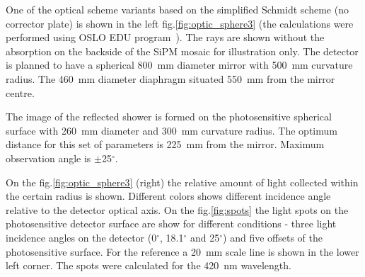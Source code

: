 \documentclass[a4paper,11pt]{article}
\begin{document}
One of the optical scheme variants based on the simplified Schmidt scheme (no corrector plate) is shown in the left fig.\ref{fig:optic_sphere3} (the calculations were performed using OSLO EDU program~\cite{Oslo}). The rays are shown without the absorption on the backside of the SiPM mosaic for illustration only. The detector is planned to have a spherical 800~mm diameter mirror with 500~mm curvature radius. The 460~mm diameter diaphragm situated 550~mm from the mirror centre.

The image of the reflected shower is formed on the photosensitive spherical surface with 260~mm diameter and 300~mm curvature radius. The optimum distance for this set of parameters is 225~mm from the mirror. Maximum observation angle is $\pm$25$^\circ$.

On the fig.\ref{fig:optic_sphere3} (right) the relative amount of light collected within the certain radius is shown. Different colors shows different incidence angle relative to the detector optical axis.
On the fig.\ref{fig:spots} the light spots on the photosensitive detector surface are show for different conditions - three light incidence angles on the detector (0$^\circ$, 18.1$^\circ$ and 25$^\circ$) and five offsets of the photosensitive surface. For the reference a 20~mm scale line is shown in the lower left corner. The spots were calculated for the 420~nm wavelength.
\end{document}
